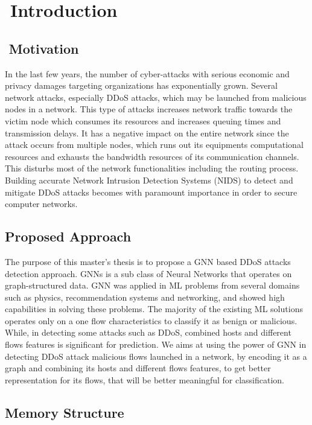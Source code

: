 \chapter{\textcolor{white}{.}Introduction}
\label{chapter:introduction}



\section{\textcolor{white}{.}Motivation}

In the last few years, the number of cyber-attacks with serious economic and privacy damages targeting organizations has exponentially grown. 
Several network attacks, especially DDoS attacks, which may be launched from malicious nodes in a network. This type of attacks increases network traffic towards the victim node which consumes its resources and increases queuing times and transmission delays. It has a negative impact on the entire network since the attack occurs from multiple nodes, which runs out its equipments computational resources and exhausts the bandwidth resources of its communication channels. This disturbs most of the network functionalities including the routing process.
Building accurate Network Intrusion Detection Systems (NIDS) to detect and mitigate DDoS attacks becomes with paramount importance in order to secure computer networks.

\section{Proposed Approach}

The purpose of this master’s thesis is to propose a GNN based DDoS attacks detection approach. GNNs is a sub class of Neural Networks that operates on graph-structured data. 
GNN was applied in ML problems from several domains such as physics, recommendation systems and networking, and showed high capabilities in solving these problems. 
The majority of the existing ML solutions operates only on a one flow characteristics to classify it as benign or malicious. While, in detecting some attacks such as DDoS, combined hosts and different flows features is significant for prediction. 
We aims at using the power of GNN in detecting DDoS attack malicious flows launched in a network, by encoding it as a graph and combining its hosts and different flows features, to get better representation for its flows, that will be better meaningful for classification.
\section{Memory Structure}

